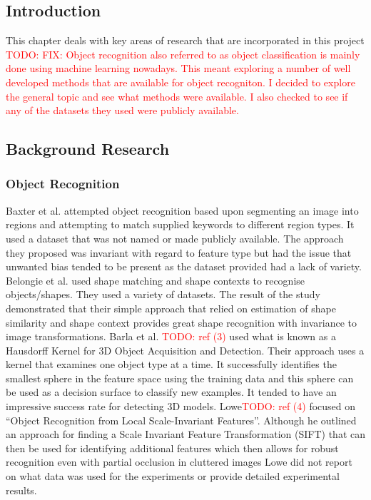 \documentclass[12pt]{article}
\begin{document}
    \subsection{Introduction}
This chapter deals with key areas of research that are incorporated in this project
\newline
\textcolor{red}{TODO: FIX:
Object recognition also referred to as object classification is mainly done using
machine learning nowadays. This meant exploring a number of well developed methods that are available for object recogniton. I decided to explore the general topic and see what
methods were available. I also checked to see if any of the datasets they used were
publicly available.}

    \subsection{Background Research}
        \subsubsection{Object Recognition}
Baxter et al. \cite{objectRecognitionMachineTranslation} attempted object recognition based upon segmenting an image into regions and attempting to match supplied keywords to different region types. It used a dataset that was not named or made publicly available. The approach they proposed was invariant with regard to feature type but had the issue that unwanted bias tended to be present as the dataset provided had a lack of variety.\bigbreak 
\noindent
Belongie et al. used shape matching and shape contexts to recognise objects/shapes. \cite{objectRecognitionShapeMatching} They used a variety of datasets. The result of the study demonstrated that their simple approach that relied on estimation of shape similarity and shape context provides great shape recognition with invariance to image transformations.\bigbreak 
\noindent
Barla et al. \textcolor{red}{TODO: ref (3)} used what is known as a Hausdorff Kernel for 3D Object Acquisition and Detection. Their approach uses a kernel that examines one object type at a time. It successfully identifies the smallest sphere in the feature space using the training data and this sphere can be used as a decision surface to classify new examples. It tended to have an impressive success rate for detecting 3D models.\bigbreak 
\noindent
Lowe\textcolor{red}{TODO: ref (4)} focused on “Object Recognition from Local Scale-Invariant Features”. Although he outlined an approach for finding a Scale Invariant Feature Transformation (SIFT) that can then be used for identifying additional features which then allows for robust recognition even with partial occlusion in cluttered images Lowe did not report on what data was used for the experiments or provide detailed experimental results.\bigbreak 
\noindent
\end{document}
